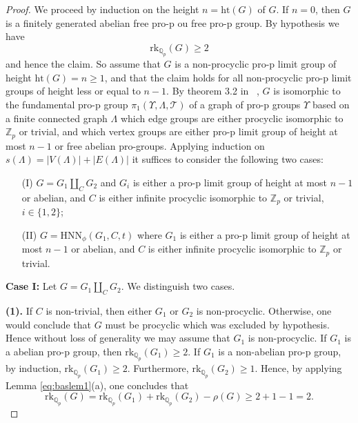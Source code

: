 \documentclass[10pt]{amsart}
\theoremstyle{plain}
\theoremstyle{definition}
\theoremstyle{remark}
\numberwithin{prop}{section}
\numberwithin{example}{section}
\numberwithin{equation}{section}
\newcommand{\Z}{\mathbb{Z}}
\newcommand{\Q}{\mathbb{Q}}
\newcommand{\rk}{\mathrm{rk}}
\newcommand{\HNN}{\mathrm{HNN}}
\newcommand{\het}{\mathrm{ht}}
\newcommand{\caT}{\mathcal{T}}
\begin{document}
\begin{proof}
	
	We proceed by induction on  the height  $n=\het(G)$ of $G$.
	If $n=0$, then $G$ is a finitely generated abelian free pro-p  ou  free pro-p   group. By hypothesis we have  	\begin{equation}
	\label{eq:mt11}
	\rk_{\Q_p}(G)\geq 2
	\end{equation} 
	and hence the claim.
	So assume that $G$ is a non-procyclic pro-p limit group   of height $\het(G)=n\geq 1$, and that the claim holds
	for all non-procyclic pro-p limit groups  of height less or equal to $n-1$. By theorem 3.2 in ~\cite{ABI},  
	$G$ is isomorphic to the fundamental pro-p group $\pi_1(\Upsilon,\Lambda,\caT)$
	of a graph of pro-p groups $\Upsilon$ based on a finite connected graph $\Lambda$ which edge groups are either procyclic isomorphic to $\Z_p$  or trivial, and which vertex groups are either pro-p limit group of height at most $n-1$ or free abelian pro-groups. 
	Applying induction on $s(\Lambda)=|V(\Lambda)|+|E(\Lambda)|$ it suffices to consider
	the following two cases:
	
	\begin{itemize}
		\item[(I)] $G=G_1 \amalg_{C} G_2$ and $G_i$ is either a pro-p limit group  of height
		at most $n-1$ or abelian, and $C$ is either infinite procyclic isomorphic to $\Z_p$ or trivial, $i\in\{1,2\}$;
		\item[(II)] $G=\HNN_\phi(G_1,C,t)$ where $G_1$ is either a pro-p limit group of height
		at most $n-1$ or abelian, and $C$ is either infinite procyclic isomorphic to $\Z_p$ or trivial.
	\end{itemize}
	
	\noindent
	{\bf Case I:} Let  $G=G_1\amalg_CG_2$. We distinguish two cases.
	
	\noindent
	{\bf (1).}  If   $C$ is non-trivial, then either $G_1$ or $G_2$ is non-procyclic. Otherwise,  one would conclude that  $G$ must be procyclic  which was excluded by hypothesis. Hence without loss of generality we may assume that $G_1$ is non-procyclic. If $G_1$ is a  abelian pro-p group, then $\rk_{\Q_p}(G_1)\geq 2$.  If $G_1$ is a  non-abelian pro-p group, by induction, $\rk_{\Q_p}(G_1)\geq 2$. Furthermore, $\rk_{\Q_p}(G_2)\geq 1$. Hence,
	by applying Lemma \ref{eq:baslem1}(a), one concludes that 
	\begin{equation}
	\rk_{\Q_p}(G)=\rk_{\Q_p}(G_1)+
	\rk_{\Q_p}(G_2)-\rho(G)\geq 2+1-1=2.
	\end{equation}
	

\end{proof}
\end{document}
